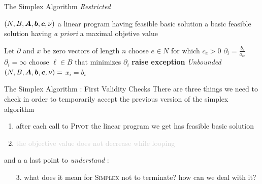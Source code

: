 \documentclass[32pt, aspectratio = 169]{beamer}
\begin{document}
\begin{frame}{The Simplex Algorithm \emph{Restricted}}
    \small{
      \begin{algorithmic}[1]
       \Require $(N, B, \boldsymbol{A}, \boldsymbol{b}, \boldsymbol{c}, \nu)$ a linear program \alert{having feasible basic solution}
       \Ensure a basic feasible solution having \textit{a priori} a maximal objetive value
       \begin{multicols}{2}
       \State Let $\partial$ and $x$ be zero vectors of length $n$
            \State choose $e \in N$ for which $c_e > 0$
                    \State $\partial_i = \frac{b_i}{a_{ie}}$
                \Else
                    \State $\partial_i = \infty$
                \EndIf
            \EndFor
            \State choose $\ell \in B$ that minimizes $\partial_i$
            \If{$\partial_\ell = \infty$}
                \State \textbf{raise exception} \textit{Unbounded}
            \Else
                \State $(N, B, \boldsymbol{A}, \boldsymbol{b}, \boldsymbol{c}, \nu) =$ 
            \EndIf
        \EndWhile
                \State $x_i = b_i$
            \EndIf
        \EndFor
        \State {}
    \EndFunction
    \end{multicols}
     \end{algorithmic}
     }
\end{frame}

\begin{frame}{The Simplex Algorithm : First Validity Checks}
    There are three things we need to check in order to temporarily accept the previous version of the simplex algorithm
    \begin{enumerate}
        \item after each call to \textsc{Pivot} the linear program we get has feasible basic solution
        \item \textcolor<3>{lightgray}{the objective value does not decrease while looping} 
    \end{enumerate}
    and a a last point to \textit{understand} :
    \begin{enumerate}
        \item[3.] what does it mean for \textsc{Simplex} not to terminate? how can we deal with it?
    \end{enumerate}
\end{frame}
\end{document}
